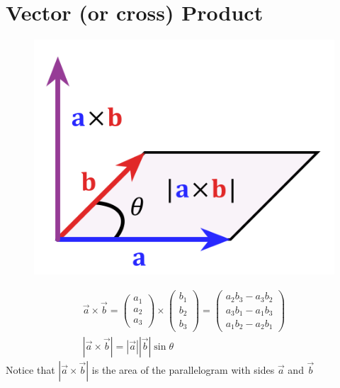 \documentclass[a4paper, 11pt, normalem]{report}
\begin{document}
\newpage
\section{Vector (or cross) Product}
\begin{figure}
    \begin{center}
        \includegraphics[scale=0.3]{Cross.png}
    \end{center}
    \vspace{-200pt}
\end{figure}
\begin{gather*}
    \vec{a} \times \vec{b} =
    \begin{pmatrix}
        a_1 \\
        a_2 \\
        a_3
    \end{pmatrix}
    \times
    \begin{pmatrix}
        b_1 \\
        b_2 \\
        b_3
    \end{pmatrix}
    =
    \begin{pmatrix}
        a_{2}b_{3} - a_{3}b_{2} \\
        a_{3}b_{1} - a_{1}b_{3} \\
        a_{1}b_{2} - a_{2}b_{1}
    \end{pmatrix} \\
    |\vec{a} \times \vec{b}| = |\vec{a}||\vec{b}|\sin\theta
\end{gather*}
Notice that $|\vec{a} \times \vec{b}|$ is the area of the parallelogram with sides $\vec{a}$ and $\vec{b}$
\end{document}
